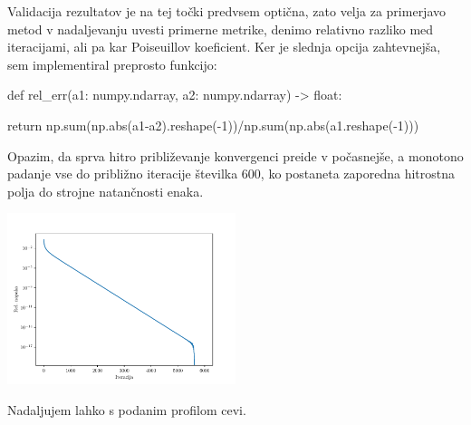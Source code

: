 Validacija rezultatov je na tej točki predvsem optična, zato velja za primerjavo metod v nadaljevanju uvesti primerne metrike, denimo relativno razliko med iteracijami, ali pa kar Poiseuillov koeficient. Ker je slednja opcija zahtevnejša, sem implementiral preprosto funkcijo:
\begin{python}
def rel_err(a1: numpy.ndarray, a2: numpy.ndarray) -> float:

    return np.sum(np.abs(a1-a2).reshape(-1))/np.sum(np.abs(a1.reshape(-1)))
\end{python}
Opazim, da sprva hitro približevanje konvergenci preide v počasnejše, a monotono padanje vse do približno iteracije številka 600, ko postaneta zaporedna hitrostna polja do strojne natančnosti enaka.
\begin{center}
    \includegraphics[width=0.5\textwidth]{../old/0-errors.pdf}
\end{center}
Nadaljujem lahko s podanim profilom cevi.
